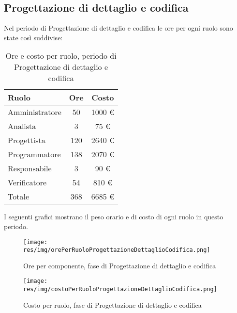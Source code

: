\subsection{Progettazione di dettaglio e codifica}
Nel periodo di Progettazione di dettaglio e codifica le ore per ogni ruolo sono state così suddivise:

\begin{table}[H]
	\centering
	\begin{tabular}{ l c c }
		\textbf{Ruolo} & \textbf{Ore} & \textbf{Costo} \\
		\hline
		Amministratore & 50 & 1000 \euro \\
		Analista & 3 & 75 \euro \\
		Progettista & 120 & 2640 \euro \\
		Programmatore & 138 & 2070 \euro \\
		Responsabile & 3 & 90 \euro \\
		Verificatore & 54 & 810 \euro \\
		\hline
		Totale & 368 & 6685 \euro \\
		\hline
	\end{tabular}
	\caption{Ore e costo per ruolo, periodo di Progettazione di dettaglio e codifica}
\end{table}

I seguenti grafici mostrano il peso orario e di costo di ogni ruolo in questo periodo.

\begin{figure}[H]
  \begin{center}
    \texttt{[image: res/img/orePerRuoloProgettazioneDettaglioCodifica.png]}
  \caption{Ore per componente, fase di Progettazione di dettaglio e codifica}
  \end{center} 
\end{figure}  

\begin{figure}[H]
  \begin{center}
    \texttt{[image: res/img/costoPerRuoloProgettazioneDettaglioCodifica.png]}
  \caption{Costo per ruolo, fase di Progettazione di dettaglio e codifica}
  \end{center} 
\end{figure}  


